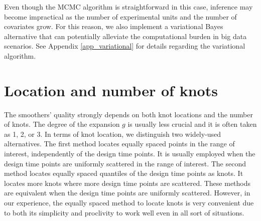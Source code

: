 \documentclass[letterpaper,10pt,openany]{article}
\begin{document}
Even though the MCMC algorithm is straightforward in this case, inference may become impractical as the number of experimental units and the number of covariates grow. For this reason, we also implement a variational Bayes alternative that can potentially alleviate the computational burden in big data scenarios. See Appendix \ref{app_variational} for details regarding the variational algorithm.


\section{Location and number of knots}\label{sec_selection_number_location_knots}


{\color{black} The smoothers'} quality strongly depends on both knot locations and the number of knots. The degree of the expansion $g$ is usually less crucial and it is often taken as 1, 2, or 3. In terms of knot location, we distinguish two widely-used alternatives. The first method locates equally spaced points in the range of interest, independently of the design time points. It is usually employed when the design time points are uniformly scattered in the range of interest. The second method locates equally spaced quantiles of the design time points as knots. It locates more knots where more design time points are scattered. These methods are equivalent when the design time points are uniformly scattered.  {\color{black} However, in our experience, the equally spaced method to locate knots is very convenient due to both its simplicity and proclivity to work well even in all sort of situations.}
\end{document}
